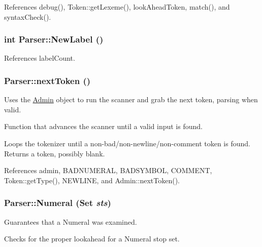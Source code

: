 References debug(), Token::getLexeme(), lookAheadToken, match(), and syntaxCheck().

\hypertarget{classParser_a8f14f036744fbf72a2d3fa1b30f5b334}{
\subsubsection[{NewLabel}]{\setlength{\rightskip}{0pt plus 5cm}int Parser::NewLabel ()}}
\label{classParser_a8f14f036744fbf72a2d3fa1b30f5b334}


References labelCount.

\hypertarget{classParser_ab53c98f6ae7ca5a9a48a1eec75fb52bc}{
\subsubsection[{nextToken}]{ Parser::nextToken ()}}
\label{classParser_ab53c98f6ae7ca5a9a48a1eec75fb52bc}


Uses the \hyperlink{classAdmin}{Admin} object to run the scanner and grab the next token, parsing when valid. 

Function that advances the scanner until a valid input is found.

Loops the tokenizer until a non-\/bad/non-\/newline/non-\/comment token is found. Returns a token, possibly blank. 

References admin, BADNUMERAL, BADSYMBOL, COMMENT, Token::getType(), NEWLINE, and Admin::nextToken().

\hypertarget{classParser_afbf7450bc228d82258cf38e8b0733005}{
\subsubsection[{Numeral}]{ Parser::Numeral ({\bf Set} {\em sts})}}
\label{classParser_afbf7450bc228d82258cf38e8b0733005}


Guarantees that a Numeral was examined. 

Checks for the proper lookahead for a Numeral stop set. 

